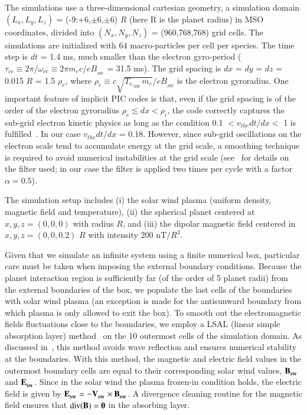 \documentclass{aa}
\begin{document}
The simulations use a three-dimensional cartesian geometry, a simulation domain $(L_x,L_y,L_z)$ = (-9:+6,$\pm$6,$\pm$6) $R$ (here R is the planet radius) in MSO coordinates, divided into $(N_x,N_y,N_z)$ = (960,768,768) grid cells. The simulations are initialized with $64$ macro-particles per cell per species. The time step is $dt$ = 1.4 ms, much smaller than the electron gyro-period ($\tau_{ce} \equiv 2\pi/\omega_{ce} \equiv 2\pi m_e c/e B_{_{SW}}$ = 31.5 ms). The grid spacing is $dx$ = $dy$ = $dz$ = 0.015 $R$ = 1.5 $\rho_e$, where $\rho_e \equiv c\sqrt{T_{e,_{SW}} m_e}/e B_{_{SW}}$ is the electron gyroradius. One important feature of implicit PIC codes is that, even if the grid spacing is of the order of the electron gyroradius $\rho_e \lesssim dx < \rho_i$, the code correctly captures the sub-grid electron kinetic physics as long as the condition 0.1 $< v_{the}dt/dx <$ 1 is fulfilled~\citep{Brackbill1982}. In our case $v_{the}dt/dx$ = 0.18.
However, since sub-grid oscillations on the electron scale tend to accumulate energy at the grid scale, a smoothing technique is required to avoid numerical instabilities at the grid scale (see~\citet{Toth2017} for details on the filter used; in our case the filter is applied two times per cycle with a factor $\alpha=0.5$).

The simulation setup includes (i) the solar wind plasma (uniform density, magnetic field and temperature), (ii) the spherical planet centered at $x,y,z=(0,0,0)$ with radius $R$, and (iii) the dipolar magnetic field centered in $x,y,z=(0,0,0.2)$ $R$ with intensity 200 nT$/R^3$.

Given that we simulate an infinite system using a finite numerical box, particular care must be taken when imposing the external boundary conditions. Because the planet interaction region is sufficiently far (of the order of 5 planet radii) from the external boundaries of the box, we populate the last cells of the boundaries with solar wind plasma (an exception is made for the antisunward boundary from which plasma is only allowed to exit the box). To smooth out the electromagnetic fields fluctuations close to the boundaries, we employ a LSAL (linear simple absorption layer) method~\citep{Berendeev2018} on the 10 outermost cells of the simulation domain. As discussed in~\citet{Berendeev2018}, this method avoids wave reflection and ensures numerical stability at the boundaries. With this method, the magnetic and electric field values in the outermost boundary cells are equal to their corresponding solar wind values, $\bf{B_{_{SW}}}$ and $\bf{E_{_{SW}}}$. Since in the solar wind the plasma frozen-in condition holds, the electric field is given by $\bf{E_{_{SW}}}=-\bf{V_{_{SW}}}\times \bf{B_{_{SW}}}$. A divergence cleaning routine for the magnetic field ensures that $\text{div}(\bf{B})=0$ in the absorbing layer.
\end{document}
